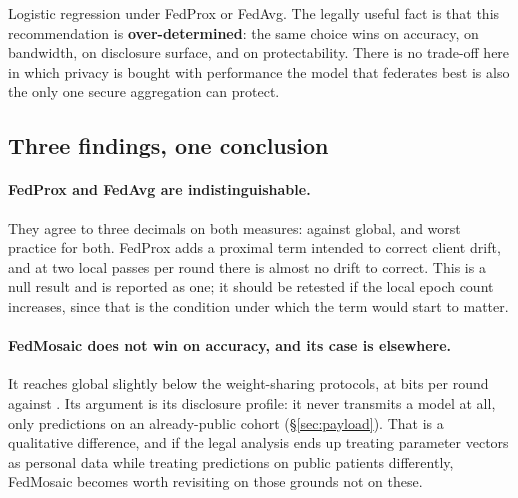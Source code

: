 \label{sec:modelchoice}
\statusMeasured

\begin{shortanswer}
Logistic regression under FedProx or FedAvg. The legally useful fact is that this recommendation is
\textbf{over-determined}: the same choice wins on accuracy, on bandwidth, on disclosure surface, and
on protectability. There is no trade-off here in which privacy is bought with performance the
model that federates best is also the only one secure aggregation can protect.
\end{shortanswer}

\subsection{Three findings, one conclusion}

\paragraph{FedProx and FedAvg are indistinguishable.} They agree to three decimals on both measures:
\BestFedAUC{} against \FedAvgAUC{} global, and \BestFedWorst{} worst practice for both. FedProx adds a proximal term
\cite{li2020fedprox} intended to correct client drift, and at two local passes per round there is
almost no drift to correct. This is a null result and is reported as one; it should be retested if
the local epoch count increases, since that is the condition under which the term would start to
matter.

\paragraph{FedMosaic does not win on accuracy, and its case is elsewhere.} It reaches \MosaicAUC{}
global slightly below the weight-sharing protocols, at \UplinkMosaic{} bits per round against
\UplinkLogreg{}. Its argument is its disclosure profile: it
never transmits a model at all, only predictions on an already-public cohort (\S\ref{sec:payload}).
That is a qualitative difference, and if the legal analysis ends up treating parameter vectors as
personal data while treating predictions on public patients differently, FedMosaic becomes worth
revisiting on those grounds not on these.

